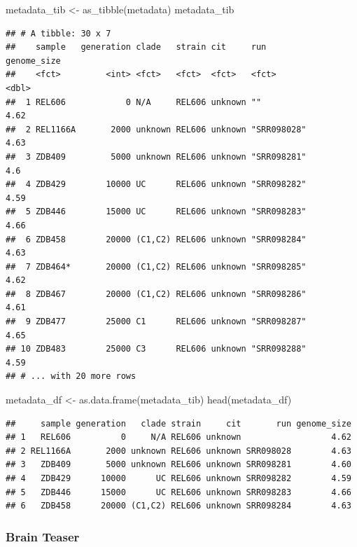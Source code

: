 \documentclass[
]{book}
\newenvironment{Shaded}{\begin{snugshade}}{\end{snugshade}}
\newcommand{\FunctionTok}[1]{\textcolor[rgb]{0.00,0.00,0.00}{#1}}
\newcommand{\NormalTok}[1]{#1}
\newcommand{\OtherTok}[1]{\textcolor[rgb]{0.56,0.35,0.01}{#1}}
\begin{document}
\begin{Shaded}
\begin{Highlighting}[]
\NormalTok{metadata\_tib }\OtherTok{\textless{}{-}} \FunctionTok{as\_tibble}\NormalTok{(metadata)}
\NormalTok{metadata\_tib}
\end{Highlighting}
\end{Shaded}

\begin{verbatim}
## # A tibble: 30 x 7
##    sample   generation clade   strain cit     run         genome_size
##    <fct>         <int> <fct>   <fct>  <fct>   <fct>             <dbl>
##  1 REL606            0 N/A     REL606 unknown ""                 4.62
##  2 REL1166A       2000 unknown REL606 unknown "SRR098028"        4.63
##  3 ZDB409         5000 unknown REL606 unknown "SRR098281"        4.6 
##  4 ZDB429        10000 UC      REL606 unknown "SRR098282"        4.59
##  5 ZDB446        15000 UC      REL606 unknown "SRR098283"        4.66
##  6 ZDB458        20000 (C1,C2) REL606 unknown "SRR098284"        4.63
##  7 ZDB464*       20000 (C1,C2) REL606 unknown "SRR098285"        4.62
##  8 ZDB467        20000 (C1,C2) REL606 unknown "SRR098286"        4.61
##  9 ZDB477        25000 C1      REL606 unknown "SRR098287"        4.65
## 10 ZDB483        25000 C3      REL606 unknown "SRR098288"        4.59
## # ... with 20 more rows
\end{verbatim}

\begin{Shaded}
\begin{Highlighting}[]
\NormalTok{metadata\_df }\OtherTok{\textless{}{-}} \FunctionTok{as.data.frame}\NormalTok{(metadata\_tib)}
\FunctionTok{head}\NormalTok{(metadata\_df)}
\end{Highlighting}
\end{Shaded}

\begin{verbatim}
##     sample generation   clade strain     cit       run genome_size
## 1   REL606          0     N/A REL606 unknown                  4.62
## 2 REL1166A       2000 unknown REL606 unknown SRR098028        4.63
## 3   ZDB409       5000 unknown REL606 unknown SRR098281        4.60
## 4   ZDB429      10000      UC REL606 unknown SRR098282        4.59
## 5   ZDB446      15000      UC REL606 unknown SRR098283        4.66
## 6   ZDB458      20000 (C1,C2) REL606 unknown SRR098284        4.63
\end{verbatim}

\hypertarget{brain-teaser}{%
\subsubsection*{Brain Teaser}\label{brain-teaser}}
\end{document}
